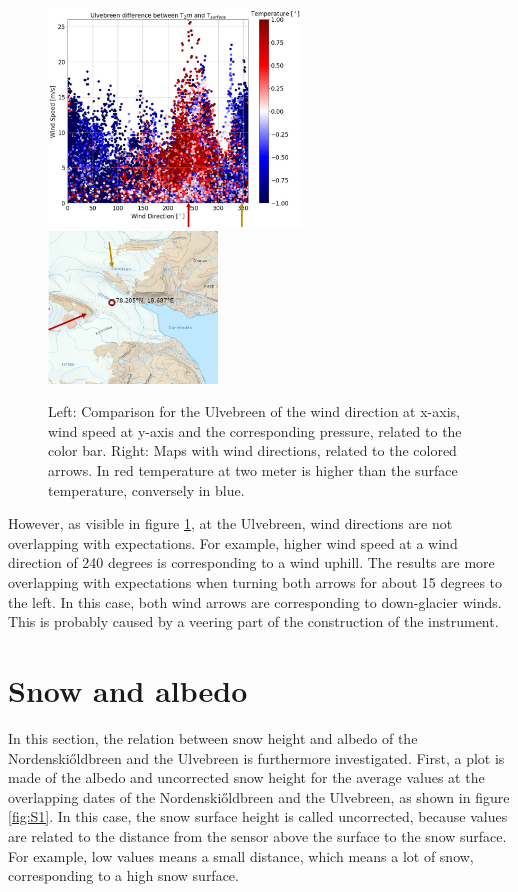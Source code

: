 \documentclass[11pt]{report}
\begin{document}
\begin{figure}[h]
\includegraphics[scale=1, width=0.6\textwidth]{norde-WS-WD.jpg}
\includegraphics[scale=1, width=0.40\textwidth]{ulve-WS-WD-rose-1.jpg}
\caption{Left: Comparison for the Ulvebreen of the wind direction at x-axis, wind speed at y-axis and the corresponding pressure, related to the color bar. Right: Maps with wind directions, related to the colored arrows. In red temperature at two meter is higher than the surface temperature, conversely in blue.}
\label{fig:PRulve}
\end{figure}

However, as visible in figure \ref{fig:PRulve}, at the Ulvebreen, wind directions are not overlapping with expectations. For example, higher wind speed at a wind direction of 240 degrees is corresponding to a wind uphill. The results are more overlapping with expectations when turning both arrows for about 15 degrees to the left. In this case, both wind arrows are corresponding to down-glacier winds. This is probably caused by a veering part of the construction of the instrument.

\section{Snow and albedo}\label{sec:rad}
In this section, the relation between snow height and albedo of the Nordenski\H{o}ldbreen and the Ulvebreen is furthermore investigated. First, a plot is made of the albedo and uncorrected snow height for the average values at the overlapping dates of the Nordenski\H{o}ldbreen and the Ulvebreen, as shown in figure \ref{fig:S1}. In this case, the snow surface height is called uncorrected, because values are related to the distance from the sensor above the surface to the snow surface. For example, low values means a small distance, which means a lot of snow, corresponding to a high snow surface.
\end{document}
